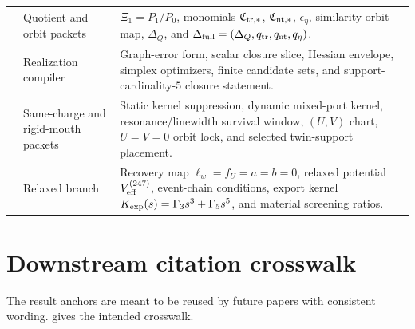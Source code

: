 \begin{longtable}{L{0.14\textwidth}L{0.30\textwidth}L{0.46\textwidth}}
\addlinespace
{} & Quotient and orbit packets & \(\Xi_1=P_1/P_0\), monomials \(\mathfrak C_{{\rm tr},*}\), \(\mathfrak C_{{\rm nt},*}\), \(\epsilon_\eta\), similarity-orbit map, \(\Delta_Q\), and \(\Delta_{\rm full}=(\Delta_Q,q_{\rm tr},q_{\rm nt},q_\eta)\). \\
\addlinespace
{} & Realization compiler & Graph-error form, scalar closure slice, Hessian envelope, simplex optimizers, finite candidate sets, and support-cardinality-\(5\) closure statement. \\
\addlinespace
{} & Same-charge and rigid-mouth packets & Static kernel suppression, dynamic mixed-port kernel, resonance/linewidth survival window, \((U,V)\) chart, \(U=V=0\) orbit lock, and selected twin-support placement. \\
\addlinespace
{} & Relaxed branch & Recovery map \(\ell_w=f_U=a=b=0\), relaxed potential \(V_{\rm eff}^{(247)}\), event-chain conditions, export kernel \(K_{\rm exp}(s)=\Gamma_3s^3+\Gamma_5s^5\), and material screening ratios. \\
\bottomrule
\end{longtable}

\section{Downstream citation crosswalk}
\label{sec:downstream-citation-crosswalk}

The result anchors are meant to be reused by future papers with consistent wording.   gives the intended crosswalk.

